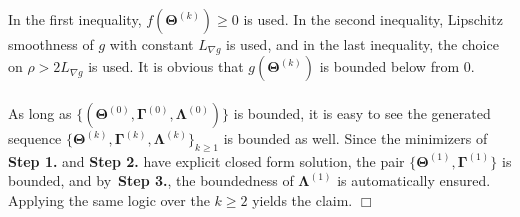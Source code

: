 \documentclass[alpha-refs]{wiley-article}
\begin{document}
In the first inequality, $f(\boldsymbol{\Theta}^{(k)}) \geq 0$ is used. 
In the second inequality, Lipschitz smoothness of $g$ with constant $L_{\nabla g}$ is used, and in the last inequality, the choice on $\rho>2L_{\nabla g}$ is used.
It is obvious that $g(\boldsymbol{\Theta}^{(k)})$ is bounded below from $0$.
\\ \\
As long as $\{(\boldsymbol{\Theta}^{(0)},\boldsymbol{\Gamma}^{(0)},\boldsymbol{\Lambda}^{(0)})\}$ is bounded, it is easy to see the generated sequence $\{\boldsymbol{\Theta}^{(k)},\boldsymbol{\Gamma}^{(k)},\boldsymbol{\Lambda}^{(k)}\}_{k \geq 1}$ is bounded as well. 
Since the minimizers of \textbf{Step 1.} and \textbf{Step 2.} have explicit closed form solution, the pair $\{\boldsymbol{\Theta}^{(1)},\boldsymbol{\Gamma}^{(1)}\}$ is bounded, and by~\textbf{Step 3.}, the boundedness of $\boldsymbol{\Lambda}^{(1)}$ is automatically ensured.
Applying the same logic over the $k \geq 2$ yields the claim.
\qquad \qquad \qquad \qquad \qquad \qquad \qquad \qquad \qquad \qquad \qquad \qquad \qquad \qquad \qquad \qquad \qquad \qquad \qquad \qquad \qquad \qquad \qquad \quad $\Box$
\end{document}
